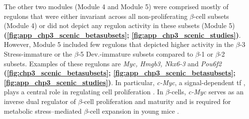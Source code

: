 The other two modules (Module 4 and Module 5) were comprised mostly of regulons that were either invariant across all non-proliferating $\beta$-cell subsets (Module 4) or did not depict any regulon activity in these subsets (Module 5) \textbf{(\autoref{fig:app_chp3_scenic_betasubsets}; \autoref{fig:app_chp3_scenic_studies})}. However, Module 5 included few regulons that depicted higher activity in the $\beta$-3 Stress-immature or the $\beta$-5 Dev.-immature subsets compared to $\beta$-1 or $\beta$-2 subsets. Examples of these regulons are \textit{Myc, Hmgb3, Nkx6-3} and \textit{Pou6f2} \textbf{(\autoref{fig:chp3_scenic_betasubsets}; \autoref{fig:app_chp3_scenic_betasubsets}; \autoref{fig:app_chp3_scenic_studies})}. In particular, \textit{c-Myc}, a signal-dependent \gls{tf} \textbf{\cite{wortham_transcriptional_2021}}, plays a central role in regulating cell proliferation \textbf{\cite{dang_c-myc_1999}}. In $\beta$-cells, \textit{c-Myc} serves as an inverse dual regulator of $\beta$-cell proliferation and maturity \textbf{\cite{puri_replication_2018}} and is required for metabolic stress–mediated $\beta$-cell expansion in young mice \textbf{\cite{rosselot_myc_2019}}.\\ 







